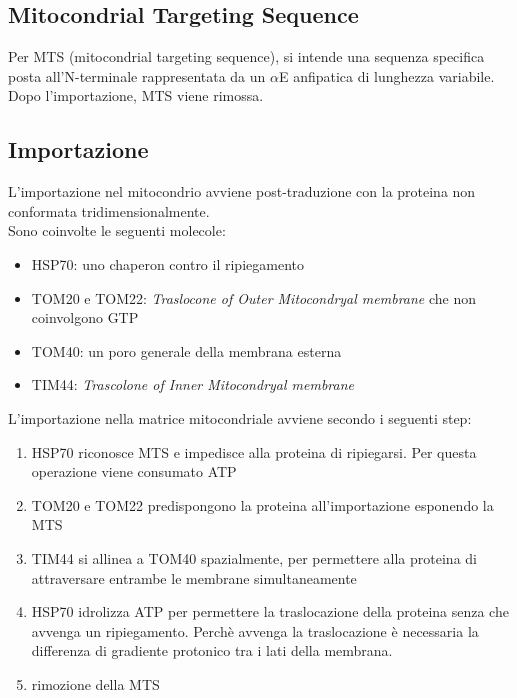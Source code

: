     \subsection{Mitocondrial Targeting Sequence}
        Per MTS (mitocondrial targeting sequence), si intende una sequenza specifica posta all'N-terminale rappresentata da un $\alpha$E anfipatica di lunghezza variabile. 
        Dopo l'importazione, MTS viene rimossa.
        
    \subsection{Importazione}
        L'importazione nel mitocondrio avviene post-traduzione con la proteina non conformata tridimensionalmente.\\
        Sono coinvolte le seguenti molecole:
        \begin{itemize}
            \item HSP70: uno chaperon contro il ripiegamento
            \item TOM20 e TOM22: \textit{Traslocone of Outer Mitocondryal membrane} che non coinvolgono GTP
            \item TOM40: un poro generale della membrana esterna
            \item TIM44: \textit{Trascolone of Inner Mitocondryal membrane}
        \end{itemize}
        L'importazione nella matrice mitocondriale avviene secondo i seguenti step:
        \begin{enumerate}
            \item HSP70 riconosce MTS e impedisce alla proteina di ripiegarsi. Per questa operazione viene consumato ATP
            \item TOM20 e TOM22 predispongono la proteina all'importazione esponendo la MTS
            \item TIM44 si allinea a TOM40 spazialmente, per permettere alla proteina di attraversare entrambe le membrane simultaneamente
            \item HSP70 idrolizza ATP per permettere la traslocazione della proteina senza che avvenga un ripiegamento. Perchè avvenga la traslocazione è necessaria la differenza di gradiente protonico tra i lati della membrana.
            \item rimozione della MTS
        \end{enumerate}
